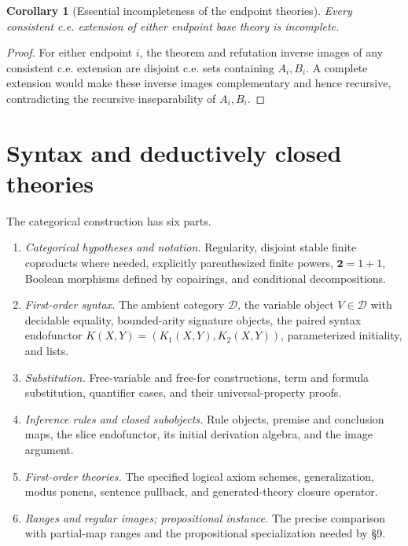 \documentclass[11pt]{article}
\newtheorem{corollary}[theorem]{Corollary}
\theoremstyle{definition}\newtheorem{definition}[theorem]{Definition}
\newcommand{\D}{\mathcal D}
\begin{document}
\begin{corollary}[Essential incompleteness of the endpoint theories]\label{cor:fork-essential}
Every consistent c.e. extension of either endpoint base theory is
incomplete.
\end{corollary}
\begin{proof}
For either endpoint $i$, the theorem and refutation inverse images
of any consistent c.e. extension are disjoint c.e. sets containing
$A_i,B_i$. A complete extension would make these inverse images
complementary and hence recursive, contradicting the recursive
inseparability of $A_i,B_i$.
\end{proof}

\appendix
\section{Syntax and deductively closed theories}
The categorical construction has six parts.
\begin{enumerate}
\item \emph{Categorical hypotheses and notation.} Regularity,
  disjoint stable finite coproducts where needed, explicitly
  parenthesized finite powers, $\mathbf2=1+1$, Boolean morphisms
  defined by copairings, and conditional decompositions.
\item \emph{First-order syntax.} The ambient category $\D$, the
  variable object $V\in\D$ with decidable equality, bounded-arity
  signature objects, the paired syntax endofunctor
  $K(X,Y)=(K_1(X,Y),K_2(X,Y))$, parameterized initiality, and lists.
\item \emph{Substitution.} Free-variable and free-for constructions,
  term and formula substitution, quantifier cases, and their
  universal-property proofs.
\item \emph{Inference rules and closed subobjects.} Rule objects,
  premise and conclusion maps, the slice endofunctor, its initial
  derivation algebra, and the image argument.
\item \emph{First-order theories.} The specified logical axiom
  schemes, generalization, modus ponens, sentence pullback, and
  generated-theory closure operator.
\item \emph{Ranges and regular images; propositional instance.}
  The precise comparison with partial-map ranges and the
  propositional specialization needed by \S9.
\end{enumerate}
\end{document}
